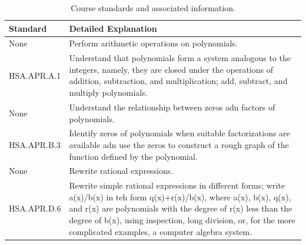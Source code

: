 \documentclass[12pt, oneside]{book}
\begin{document}
\begin{table}[h]
    \centering
    \caption{Course standards and associated information.}
    \vspace{0.3cm} %
    \begin{tabularx}{\textwidth}{l X} %
        \toprule
        \textbf{Standard} & \textbf{Detailed Explanation} \\
        \midrule
        None & Perform arithmetic operations on polynomials. \\
        HSA.APR.A.1 & Understand that polynomials form a system analogous to the integers, namely, they are closed under the operations of addition, subtraction, and multiplication; add, subtract, and multiply polynomials. \\
        None & Understand the relationship between zeros adn factors of polynomials. \\
        HSA.APR.B.3 & Identify zeros of polynomials when suitable factorizations are available adn use the zeros to construct a rough graph of the function defined by the polynomial. \\
        None & Rewrite rational expressions. \\
        HSA.APR.D.6 & Rewrite simple rational expressions in different forms; write a(x)/b(x) in teh form q(x)+r(x)/b(x), where a(x), b(x), q(x), and r(x) are polynomials with the degree of r(x) less than the degree of b(x), using inspection, long division, or, for the more complicated examples, a computer algebra system. \\
        \bottomrule
    \end{tabularx}
\end{table}
\end{document}
